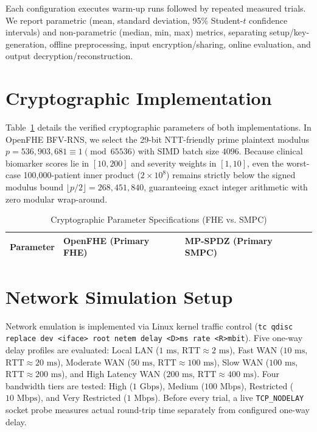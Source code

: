 \documentclass[conference]{IEEEtran}
\begin{document}
Each configuration executes warm-up runs followed by repeated measured trials. We report parametric (mean, standard deviation, 95\% Student-$t$ confidence intervals) and non-parametric (median, min, max) metrics, separating setup/key-generation, offline preprocessing, input encryption/sharing, online evaluation, and output decryption/reconstruction.

\section{Cryptographic Implementation}
Table~\ref{tab:crypto_params} details the verified cryptographic parameters of both implementations. In OpenFHE BFV-RNS, we select the 29-bit NTT-friendly prime plaintext modulus $p = 536,903,681 \equiv 1 \pmod{65536}$ with SIMD batch size $4096$. Because clinical biomarker scores lie in $[10, 200]$ and severity weights in $[1, 10]$, even the worst-case 100,000-patient inner product ($2 \times 10^8$) remains strictly below the signed modulus bound $\lfloor p/2 \rfloor = 268,451,840$, guaranteeing exact integer arithmetic with zero modular wrap-around.

\begin{table}[htbp]
\caption{Cryptographic Parameter Specifications (FHE vs. SMPC)}
\label{tab:crypto_params}
\centering
\scriptsize
\begin{tabular}{@{}lll@{}}
\toprule
\textbf{Parameter} & \textbf{OpenFHE (Primary FHE)} & \textbf{MP-SPDZ (Primary SMPC)} \\
\midrule
\bottomrule
\end{tabular}
\end{table}

\section{Network Simulation Setup}
Network emulation is implemented via Linux kernel traffic control (\texttt{tc qdisc replace dev <iface> root netem delay <D>ms rate <R>mbit}). Five one-way delay profiles are evaluated: Local LAN ($1\text{ ms}$, $\text{RTT} \approx 2\text{ ms}$), Fast WAN ($10\text{ ms}$, $\text{RTT} \approx 20\text{ ms}$), Moderate WAN ($50\text{ ms}$, $\text{RTT} \approx 100\text{ ms}$), Slow WAN ($100\text{ ms}$, $\text{RTT} \approx 200\text{ ms}$), and High Latency WAN ($200\text{ ms}$, $\text{RTT} \approx 400\text{ ms}$). Four bandwidth tiers are tested: High ($1\text{ Gbps}$), Medium ($100\text{ Mbps}$), Restricted ($10\text{ Mbps}$), and Very Restricted ($1\text{ Mbps}$). Before every trial, a live \texttt{TCP\_NODELAY} socket probe measures actual round-trip time separately from configured one-way delay.
\end{document}
